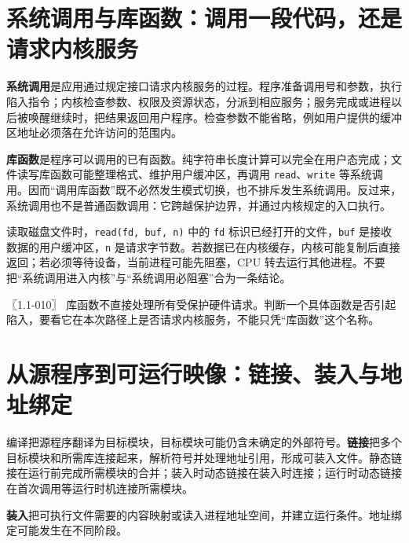 \section{系统调用与库函数：调用一段代码，还是请求内核服务}\label{os-1-5}

\textbf{系统调用}是应用通过规定接口请求内核服务的过程。程序准备调用号和参数，执行陷入指令；内核检查参数、权限及资源状态，分派到相应服务；服务完成或进程以后被唤醒继续时，把结果返回用户程序。检查参数不能省略，例如用户提供的缓冲区地址必须落在允许访问的范围内。

\textbf{库函数}是程序可以调用的已有函数。纯字符串长度计算可以完全在用户态完成；文件读写库函数可能整理格式、维护用户缓冲区，再调用 \allowbreak{}\texttt{read}、\allowbreak{}\texttt{write} 等系统调用。因而``调用库函数''既不必然发生模式切换，也不排斥发生系统调用。反过来，系统调用也不是普通函数调用：它跨越保护边界，并通过内核规定的入口执行。

读取磁盘文件时，\allowbreak{}\texttt{read(fd,}\allowbreak{}\texttt{\ buf,}\allowbreak{}\texttt{\ n)} 中的 \allowbreak{}\texttt{fd} 标识已经打开的文件，\allowbreak{}\texttt{buf} 是接收数据的用户缓冲区，\allowbreak{}\texttt{n} 是请求字节数。若数据已在内核缓存，内核可能复制后直接返回；若必须等待设备，当前进程可能先阻塞，CPU 转去运行其他进程。不要把``系统调用进入内核''与``系统调用必阻塞''合为一条结论。

\noindent{}〖1.1-010〗 库函数不直接处理所有受保护硬件请求。判断一个具体函数是否引起陷入，要看它在本次路径上是否请求内核服务，不能只凭``库函数''这个名称。

\section{从源程序到可运行映像：链接、装入与地址绑定}\label{os-1-6}

编译把源程序翻译为目标模块，目标模块可能仍含未确定的外部符号。\textbf{链接}把多个目标模块和所需库连接起来，解析符号并处理地址引用，形成可装入文件。静态链接在运行前完成所需模块的合并；装入时动态链接在装入时连接；运行时动态链接在首次调用等运行时机连接所需模块。

\textbf{装入}把可执行文件需要的内容映射或读入进程地址空间，并建立运行条件。地址绑定可能发生在不同阶段。


